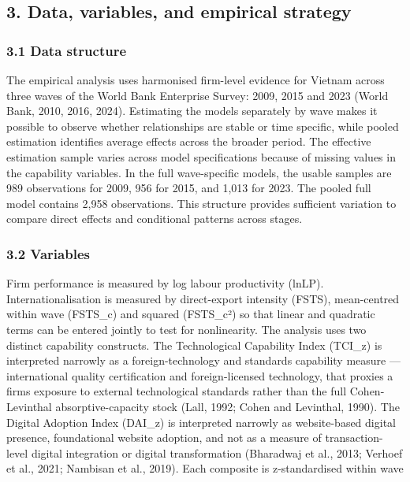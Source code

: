 \documentclass[12pt,a4paper]{article}
\begin{document}
\hypertarget{3-data-variables-and-empirical-strategy}{%
\subsection{3. Data, variables, and empirical
strategy}\label{3-data-variables-and-empirical-strategy}}

\hypertarget{31-data-structure}{%
\subsubsection{3.1 Data structure}\label{31-data-structure}}

The empirical analysis uses harmonised firm-level evidence for Vietnam
across three waves of the World Bank Enterprise Survey: 2009, 2015 and
2023 (World Bank, 2010, 2016, 2024). Estimating the models separately by
wave makes it possible to observe whether relationships are stable or
time specific, while pooled estimation identifies average effects across
the broader period. The effective estimation sample varies across model
specifications because of missing values in the capability variables. In
the full wave-specific models, the usable samples are 989 observations
for 2009, 956 for 2015, and 1,013 for 2023. The pooled full model
contains 2,958 observations. This structure provides sufficient
variation to compare direct effects and conditional patterns across
stages.

\hypertarget{32-variables}{%
\subsubsection{3.2 Variables}\label{32-variables}}

Firm performance is measured by log labour productivity (lnLP).
Internationalisation is measured by direct-export intensity (FSTS),
mean-centred within wave (FSTS\_c) and squared (FSTS\_c²) so that linear
and quadratic terms can be entered jointly to test for nonlinearity. The
analysis uses two distinct capability constructs. The Technological
Capability Index (TCI\_z) is interpreted narrowly as a
foreign-technology and standards capability measure --- international
quality certification and foreign-licensed technology, that proxies a
firm\textquotesingle s exposure to external technological standards
rather than the full Cohen-Levinthal absorptive-capacity stock (Lall,
1992; Cohen and Levinthal, 1990). The Digital Adoption Index (DAI\_z) is
interpreted narrowly as website-based digital presence, foundational
website adoption, and not as a measure of transaction-level digital
integration or digital transformation (Bharadwaj et al., 2013; Verhoef
et al., 2021; Nambisan et al., 2019). Each composite is z-standardised
within wave
\end{document}
